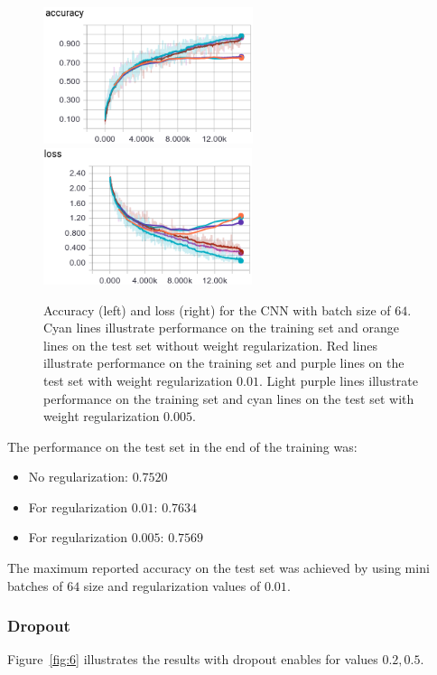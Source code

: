\documentclass{article}
\begin{document}
\begin{figure}[h!]
\centering
\includegraphics[height=4.0cm]{acc-linear-64-reg.png}\
\includegraphics[height=4.0cm]{loss-linear-64-reg.png}
\caption{Accuracy (left) and loss (right) for the CNN with batch size of $64$. Cyan lines illustrate performance on the training set and orange lines on the test set without weight regularization. Red lines illustrate performance on the training set and purple lines on the test set with weight regularization $0.01$. Light purple lines illustrate performance on the training set and cyan lines on the test set with weight regularization $0.005$.}
\label{fig:5}
\end{figure}
The performance on the test set in the end of the training was:
\begin{itemize}
\item No regularization: $0.7520$
\item For regularization $0.01$: $\mathbf{0.7634}$
\item For regularization $0.005$: $0.7569$
\end{itemize}
The maximum reported accuracy on the test set was achieved by using mini batches of $64$ size and regularization values of $0.01$.


\subsubsection{Dropout}
Figure~\ref{fig:6} illustrates the results with dropout enables for values $0.2, 0.5$.
\end{document}
